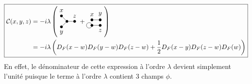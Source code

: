 \documentclass{article}
\numberwithin{equation}{section}
\theoremstyle{solution}
\begin{document}
\begin{equation}
        \boxed{
        \begin{aligned}
                \mathcal{C}(x, y, z) &= -i\lambda \left( 
\begin{tikzpicture}[baseline={([yshift=-.5ex]current bounding box.center)}, scale=0.3]
        \node[circle, fill=black, inner sep=1.5pt, label=above:{$x$}] (x) at (-1, 1) {};
        \node[circle, fill=black, inner sep=1.5pt, label=below:{$y$}] (y) at (-1, -1) {};
        \node[circle, fill=black, inner sep=1.5pt, label=above:{$z$}] (z) at (1.4, 0) {};
        \node[circle, fill=black, inner sep=1.5pt] (w) at (0, 0) {};
        \draw (x) edge (w);
        \draw (y) edge (w);
        \draw (z) edge (w);
\end{tikzpicture}
+ 
\begin{tikzpicture}[baseline={([yshift=-.5ex]current bounding box.center)}, scale=0.3]
        \node[circle, fill=black, inner sep=1.5pt, label=above:{$x$}] (x) at (-.5, .5) {};
        \node[circle, fill=black, inner sep=1.5pt, label=above:{$y$}] (y) at (1, .5) {};
        \node[circle, fill=black, inner sep=1.5pt, label=below:{$z$}] (z) at (1, -0.5) {};
        \node[circle, fill=black, inner sep=1.5pt] (w) at (-.5, -0.5) {};
        \draw (x) edge (y);
        \draw (w) edge (z);
        \draw (-1, -0.5) circle (0.5);
\end{tikzpicture}
        \right)\\
        &=
-i\lambda \left( D_F(x-w)D_F(y - w)D_F(z - w) + \frac{1}{2}D_F(x - y)D_F(z - w)D_F(w) \right)
        \end{aligned}
}
\end{equation} 
En effet, le dénominateur de cette expression à l'ordre $\lambda$ devient simplement l'unité puisque le terme 
à l'ordre $\lambda$ contient $3$ champs $\phi$.
\end{document}
